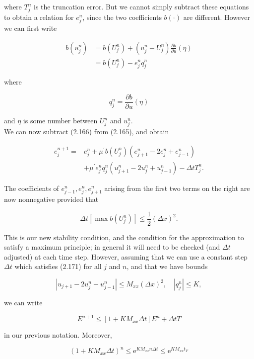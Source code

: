\documentclass[10pt]{article}
\begin{document}
where \(T_{j}^{n}\) is the truncation error. But we cannot simply subtract these equations to obtain a relation for \(e_{j}^{n}\), since the two coefficients \(b(\cdot)\) are different. However we can first write

\[
\begin{aligned}
b\left(u_{j}^{n}\right) & =b\left(U_{j}^{n}\right)+\left(u_{j}^{n}-U_{j}^{n}\right) \frac{\partial b}{\partial u}(\eta) \\
& =b\left(U_{j}^{n}\right)-e_{j}^{n} q_{j}^{n}
\end{aligned}
\]

where

\[
q_{j}^{n}=\frac{\partial b}{\partial u}(\eta)
\]

and \(\eta\) is some number between \(U_{j}^{n}\) and \(u_{j}^{n}\).\\
We can now subtract (2.166) from (2.165), and obtain

\[
\begin{aligned}
e_{j}^{n+1}= & e_{j}^{n}+\mu^{\prime} b\left(U_{j}^{n}\right)\left(e_{j+1}^{n}-2 e_{j}^{n}+e_{j-1}^{n}\right) \\
& +\mu^{\prime} e_{j}^{n} q_{j}^{n}\left(u_{j+1}^{n}-2 u_{j}^{n}+u_{j-1}^{n}\right)-\Delta t T_{j}^{n} .
\end{aligned}
\]

The coefficients of \(e_{j-1}^{n}, e_{j}^{n}, e_{j+1}^{n}\) arising from the first two terms on the right are now nonnegative provided that

\[
\Delta t\left[\max b\left(U_{j}^{n}\right)\right] \leq \frac{1}{2}(\Delta x)^{2} .
\]

This is our new stability condition, and the condition for the approximation to satisfy a maximum principle; in general it will need to be checked (and \(\Delta t\) adjusted) at each time step. However, assuming that we can use a constant step \(\Delta t\) which satisfies (2.171) for all \(j\) and \(n\), and that we have bounds

\[
\left|u_{j+1}-2 u_{j}^{n}+u_{j-1}^{n}\right| \leq M_{x x}(\Delta x)^{2}, \quad\left|q_{j}^{n}\right| \leq K,
\]

we can write

\[
E^{n+1} \leq\left[1+K M_{x x} \Delta t\right] E^{n}+\Delta t T
\]

in our previous notation. Moreover,

\[
\left(1+K M_{x x} \Delta t\right)^{n} \leq \mathrm{e}^{K M_{x x} n \Delta t} \leq \mathrm{e}^{K M_{x x} t_{F}}
\]
\end{document}
